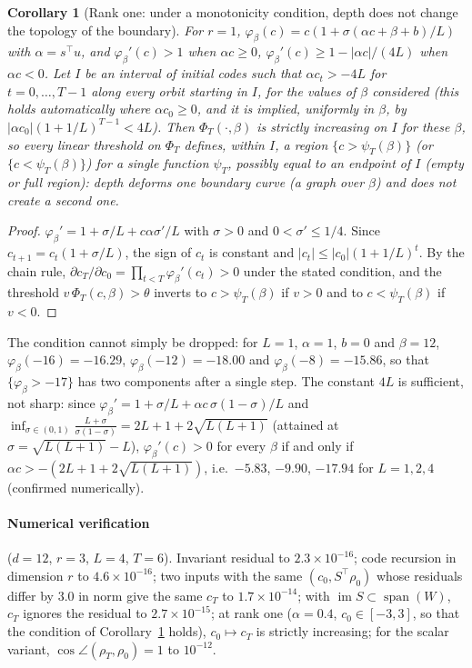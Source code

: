 \documentclass[11pt,a4paper]{article}
\theoremstyle{plain}
\newtheorem{corollary}{Corollary}
\theoremstyle{definition}
\theoremstyle{remark}
\newcommand{\im}{\operatorname{im}}
\newcommand{\spn}{\operatorname{span}}
\newcommand{\T}{\top}
\begin{document}
\begin{corollary}[Rank one: under a monotonicity condition, depth does not change the topology of the boundary]
\label{cor:A2}
For $r=1$, $\varphi_\beta(c)=c(1+\sigma(\alpha c+\beta+b)/L)$ with
$\alpha=s^\T u$, and $\varphi_\beta'(c)>1$ when $\alpha c\ge0$,
$\varphi_\beta'(c)\ge1-|\alpha c|/(4L)$ when $\alpha c<0$. Let $I$ be an
interval of initial codes such that $\alpha c_t>-4L$ for $t=0,\dots,T-1$
along every orbit starting in $I$, for the values of $\beta$ considered
(this holds automatically where $\alpha c_0\ge0$, and it is implied,
uniformly in $\beta$, by $|\alpha c_0|(1+1/L)^{T-1}<4L$). Then
$\Phi_T(\cdot,\beta)$ is strictly increasing on $I$ for these $\beta$, so
every linear threshold on $\Phi_T$ defines, within $I$, a region
$\{c>\psi_T(\beta)\}$ (or $\{c<\psi_T(\beta)\}$) for a single function
$\psi_T$, possibly equal to an endpoint of $I$ (empty or full region):
depth deforms one boundary curve (a graph over $\beta$) and does not create
a second one.
\end{corollary}
\begin{proof}
$\varphi_\beta'=1+\sigma/L+c\alpha\sigma'/L$ with $\sigma>0$ and
$0<\sigma'\le1/4$. Since $c_{t+1}=c_t(1+\sigma/L)$, the sign of $c_t$ is
constant and $|c_t|\le|c_0|(1+1/L)^t$. By the chain rule,
$\partial c_T/\partial c_0=\prod_{t<T}\varphi_\beta'(c_t)>0$ under the stated
condition, and the threshold $v\,\Phi_T(c,\beta)>\theta$ inverts to
$c>\psi_T(\beta)$ if $v>0$ and to $c<\psi_T(\beta)$ if $v<0$.
\end{proof}
The condition cannot simply be dropped: for $L=1$, $\alpha=1$, $b=0$ and
$\beta=12$, $\varphi_\beta(-16)=-16.29$, $\varphi_\beta(-12)=-18.00$ and
$\varphi_\beta(-8)=-15.86$, so that $\{\varphi_\beta>-17\}$ has two
components after a single step. The constant $4L$ is sufficient, not sharp:
since $\varphi_\beta'=1+\sigma/L+\alpha c\,\sigma(1-\sigma)/L$ and
$\inf_{\sigma\in(0,1)}\frac{L+\sigma}{\sigma(1-\sigma)}=2L+1+2\sqrt{L(L+1)}$
(attained at $\sigma=\sqrt{L(L+1)}-L$), $\varphi_\beta'(c)>0$ for every
$\beta$ if and only if $\alpha c>-(2L+1+2\sqrt{L(L+1)})$, i.e.\ $-5.83$,
$-9.90$, $-17.94$ for $L=1,2,4$ (confirmed numerically).

\paragraph{Numerical verification} ($d=12$, $r=3$, $L=4$, $T=6$). Invariant
residual to $2.3\times10^{-16}$; code recursion in dimension $r$ to
$4.6\times10^{-16}$; two inputs with the same $(c_0,S^\T\rho_0)$ whose
residuals differ by $3.0$ in norm give the same $c_T$ to $1.7\times10^{-14}$;
with $\im S\subset\spn(W)$, $c_T$ ignores the residual to
$2.7\times10^{-15}$; at rank one ($\alpha=0.4$, $c_0\in[-3,3]$, so that the
condition of Corollary~\ref{cor:A2} holds), $c_0\mapsto c_T$ is strictly
increasing; for the scalar variant, $\cos\angle(\rho_T,\rho_0)=1$ to
$10^{-12}$.
\end{document}

